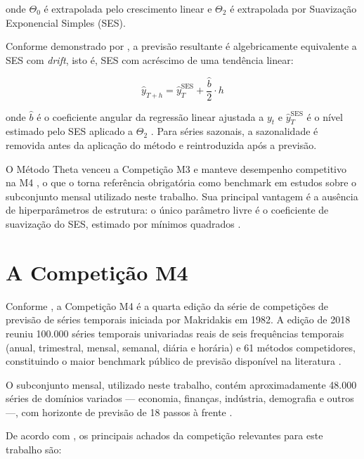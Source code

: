 \documentclass[
  12pt,
  openright,
  twoside,
  a4paper,
  english,
  brazil
]{abntex2}
\begin{document}
onde $\Theta_0$ é extrapolada pelo crescimento linear e $\Theta_2$ é extrapolada por Suavização Exponencial Simples (SES).

Conforme demonstrado por , a previsão resultante é algebricamente equivalente a SES com \textit{drift}, isto é, SES com acréscimo de uma tendência linear:

\begin{equation}
  \hat{y}_{T+h} = \hat{y}_{T}^{\text{SES}} + \frac{\hat{b}}{2} \cdot h
  \label{eq:theta-ses-drift}
\end{equation}

onde $\hat{b}$ é o coeficiente angular da regressão linear ajustada a $y_t$ e $\hat{y}_{T}^{\text{SES}}$ é o nível estimado pelo SES aplicado a $\Theta_2$ \cite{hyndman2003unmasking}. Para séries sazonais, a sazonalidade é removida antes da aplicação do método e reintroduzida após a previsão.

O Método Theta venceu a Competição M3 \cite{assimakopoulos2000theta} e manteve desempenho competitivo na M4 \cite{makridakis2018m4results}, o que o torna referência obrigatória como benchmark em estudos sobre o subconjunto mensal utilizado neste trabalho. Sua principal vantagem é a ausência de hiperparâmetros de estrutura: o único parâmetro livre é o coeficiente de suavização do SES, estimado por mínimos quadrados \cite{hyndman2003unmasking}.

\section{A Competição M4}
\label{sec:m4}

Conforme , a Competição M4 é a quarta edição da série de competições de previsão de séries temporais iniciada por Makridakis em 1982. A edição de 2018 reuniu 100.000 séries temporais univariadas reais de seis frequências temporais (anual, trimestral, mensal, semanal, diária e horária) e 61 métodos competidores, constituindo o maior benchmark público de previsão disponível na literatura \cite{makridakis2020m4}.

O subconjunto mensal, utilizado neste trabalho, contém aproximadamente 48.000 séries de domínios variados — economia, finanças, indústria, demografia e outros —, com horizonte de previsão de 18 passos à frente \cite{makridakis2020m4}.

De acordo com , os principais achados da competição relevantes para este trabalho são:
\end{document}
